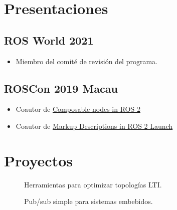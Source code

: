 \documentclass[spanish, letterpaper]{resume}
\begin{document}
\noindent\begin{minipage}[t]{0.475\linewidth}
  \section*{Presentaciones}
  \subsection*[\icon{ros}]{ROS World 2021}
  \begin{itemize}
    \item Miembro del comité de revisión del programa.
  \end{itemize}
  \subsection*[\icon{ros}]{ROSCon 2019 Macau}
  \begin{itemize}
    \item Coautor de \href{https://roscon.ros.org/2019/talks/roscon2019_composablenodes.pdf}{Composable nodes in  ROS 2}
    \item Coautor de \href{https://roscon.ros.org/2019/talks/roscon2019_markupextensionsforros2launch.pdf}{Markup Descriptions in ROS 2 Launch}
  \end{itemize}
\end{minipage}\hfill
\begin{minipage}[t]{0.475\linewidth}
  \section*{Proyectos}
  \begin{description}
    \item[] Herramientas para optimizar topologías LTI.
    \item[] Pub/sub simple para sistemas embebidos.
  \end{description}
\end{minipage}
\end{document}
